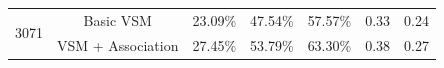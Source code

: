 \documentclass[conference]{IEEEtran}
\begin{document}
\begin{table}[htbp]
{\begin{tabular}{c|c|c|c|c|c|c}
			\multirow{2}{*}{3071}                                                                               & Basic VSM & 23.09\% & 47.54\% & 57.57\% & 0.33 & 0.24 \\  \cline{2-7}   &VSM + Association     & 27.45\%                                                 & 53.79\%                                                 & 63.30\%                                                  &   0.38  &  0.27    \\ 
			\hline
	\end{tabular}}
	\centering
\end{table}
 
\end{document}

